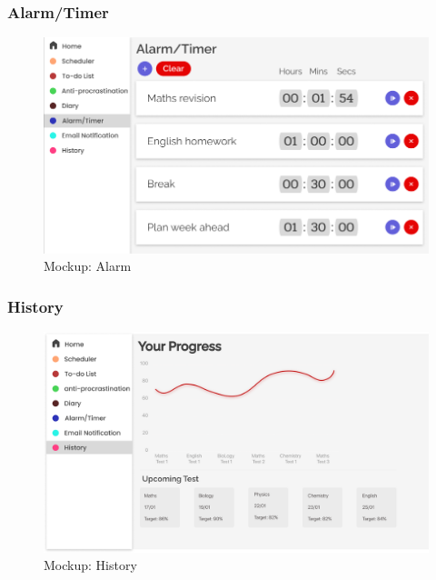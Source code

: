 \documentclass[a4paper]{article}
\begin{document}
\subsubsection{Alarm/Timer}

\begin{figure}[H] %
	\centering %
	\includegraphics[width=1\textwidth]{./images/Mockup_AlarmTimer.png} %
	\caption*{Mockup: Alarm} %
	\label{Fig.Alarm} %
\end{figure}

\subsubsection{History}

\begin{figure}[H] %
	\centering %
	\includegraphics[width=1\textwidth]{./images/Mockup_History.png} %
	\caption*{Mockup: History} %
	\label{Fig.History} %
\end{figure}
\end{document}
